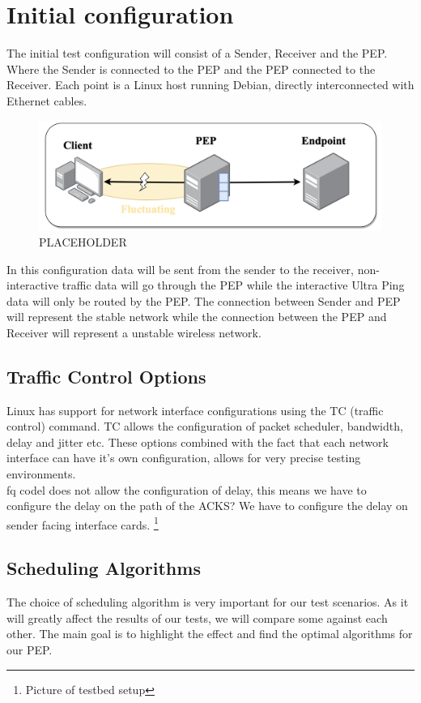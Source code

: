 \documentclass[a4paper,english, 11pt]{report}
\begin{document}
\section{Initial configuration}
The initial test configuration will consist of a Sender, Receiver and the PEP. Where the Sender is connected to the PEP and the PEP connected to the Receiver. Each point is a Linux host running Debian, directly interconnected with Ethernet cables.\\

\begin{figure}[h!] %
	\centering
	\includegraphics[scale=0.45]{../diagrams/drawio/simple_pep_design.png}
  	\caption{PLACEHOLDER}
  	\label{fig:inital_configuration}
\end{figure}

In this configuration data will be sent from the sender to the receiver, non-interactive traffic data will go through the PEP while the interactive Ultra Ping data will only be routed by the PEP. The connection between Sender and PEP will represent the stable network while the connection between the PEP and Receiver will represent a unstable wireless network.

\subsection{Traffic Control Options}
Linux has support for network interface configurations using the TC (traffic control) command. TC allows the configuration of packet scheduler, bandwidth, delay and jitter etc. These options combined with the fact that each network interface can have it's own configuration, allows for very precise testing environments. 
\\
fq codel does not allow the configuration of delay, this means we have to configure the delay on the path of the ACKS?
We have to configure the delay on sender facing interface cards. 
\footnote{Picture of testbed setup} 

\subsection{Scheduling Algorithms}
The choice of scheduling algorithm is very important for our test scenarios. As it will greatly affect the results of our tests, we will compare some against each other. The main goal is to highlight the effect and find the optimal algorithms for our PEP.
\end{document}
